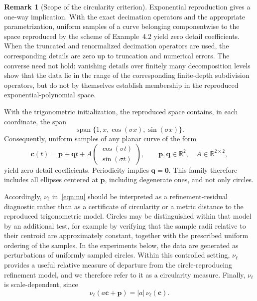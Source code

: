\documentclass[11pt,a4paper]{article}
\theoremstyle{definition}
\newtheorem{remark}[theorem]{Remark}
\begin{document}
\begin{remark}[Scope of the circularity criterion] \label{rem:ellipses}
Exponential reproduction gives a one-way implication. With the exact
decimation operators and the appropriate parametrization, uniform samples
of a curve belonging componentwise to the space reproduced by the scheme
of Example~4.2 yield zero detail coefficients. When the truncated and
renormalized decimation operators are used, the corresponding details are
zero up to truncation and numerical errors. The converse need not hold:
vanishing details over finitely many decomposition levels show that the data
lie in the range of the corresponding finite-depth subdivision operators, but
do not by themselves establish membership in the reproduced
exponential-polynomial space.

With the trigonometric initialization, the reproduced space contains, in
each coordinate, the span
\[
    \operatorname{span}\{1,x,\cos(\sigma x),\sin(\sigma x)\}.
\]
Consequently, uniform samples of any planar curve of the form
\[
    \boldsymbol{c}(t)
    =
    \boldsymbol{p}+\boldsymbol{q}t+
    A
    \begin{pmatrix}
        \cos(\sigma t)\\
        \sin(\sigma t)
    \end{pmatrix},
    \qquad
    \boldsymbol{p},\boldsymbol{q}\in\mathbb{R}^{2},
    \quad A\in\mathbb{R}^{2\times2},
\]
yield zero detail coefficients. Periodicity implies $\boldsymbol{q}=\boldsymbol{0}$. This family therefore includes all ellipses centered at $\boldsymbol{p}$, including degenerate ones, and not only circles.

Accordingly, $\nu_\ell$ in~\eqref{eqn:nu} should be interpreted
as a refinement-residual diagnostic rather than as a certificate of
circularity or a metric distance to the reproduced trigonometric model.
Circles may be distinguished within that model by an additional test, for
example by verifying that the sample radii relative to their centroid are
approximately constant, together with the prescribed uniform ordering of
the samples. In the experiments below, the data are generated as
perturbations of uniformly sampled circles. Within this controlled setting,
$\nu_\ell$ provides a useful relative measure of departure from the
circle-reproducing refinement model, and we therefore refer to it as a
circularity measure. Finally, $\nu_\ell$ is scale-dependent, since
\[
    \nu_\ell(a\boldsymbol{c}+\boldsymbol{p})
    =
    |a|\,\nu_\ell(\boldsymbol{c}).
\]
\end{remark}
\end{document}
